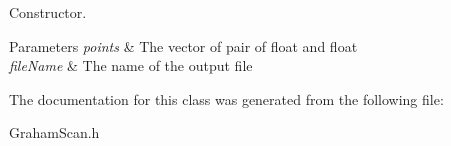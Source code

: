 Constructor. 


\begin{DoxyParams}{Parameters}
{\em points} & The vector of pair of float and float \\
\hline
{\em file\+Name} & The name of the output file \\
\hline
\end{DoxyParams}


The documentation for this class was generated from the following file\+:\begin{DoxyCompactItemize}
\item 
Graham\+Scan.\+h\end{DoxyCompactItemize}
